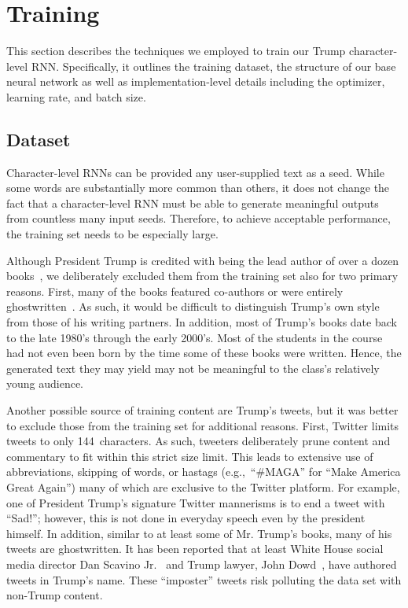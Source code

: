 \documentclass{article}
\begin{document}
\section{Training}\label{sec:training}

This section describes the techniques we employed to train our Trump character-level RNN.  Specifically, it outlines the training dataset, the structure of our base neural network as well as implementation-level details including the optimizer, learning rate, and batch size.

\subsection{Dataset}

Character-level RNNs can be provided any user-supplied text as a seed.  While some words are substantially more common than others, it does not change the fact that a character-level RNN must be able to generate meaningful outputs from countless many input seeds. Therefore, to achieve acceptable performance, the training set needs to be especially large.

Although President Trump is credited with being the lead author of over a dozen books~\cite{trumpArtOfTheDeal,trumpSurvivingAtTheTop,trumpArtOfTheComeback,trumpTheAmericaWeDeserve,trumpHowToGetRich,trumpCrippledAmerica,trumpTimeToGetTough,trumpThinkBig,trump101,trumpNeverGiveUp,trumpWhyWeWantYou,trumpBestGolfAdvice,trumpMidasTouch}, we deliberately excluded them from the training set also for two primary reasons.  First, many of the books featured co-authors or were entirely ghostwritten~\cite{mayerNewYorkerGhostwriter}.  As such, it would be difficult to distinguish Trump's own style from those of his writing partners.  In addition, most of Trump's books date back to the late 1980's through the early 2000's.  Most of the students in the course had not even been born by the time some of these books were written. Hence, the generated text they may yield may not be meaningful to the class's relatively young audience.

Another possible source of training content are Trump's tweets, but it was better to exclude those from the training set for additional reasons.  First, Twitter limits tweets to only 144~characters. As such, tweeters deliberately prune content and commentary to fit within this strict size limit.  This leads to extensive use of abbreviations, skipping of words, or hastags (e.g.,~``\#MAGA'' for ``Make America Great Again'') many of which are exclusive to the Twitter platform. For example, one of President Trump's signature Twitter mannerisms is to end a tweet with ``Sad!''; however, this is not done in everyday speech even by the president himself. In addition, similar to at least some of Mr. Trump's books, many of his tweets are ghostwritten.  It has been reported that at least White House social media director Dan Scavino Jr.~\cite{ohlheiser2017} and Trump lawyer, John Dowd~\cite{phillipsBlake2017}, have authored tweets in Trump's name.  These ``imposter'' tweets risk polluting the data set with non-Trump content.
\end{document}
